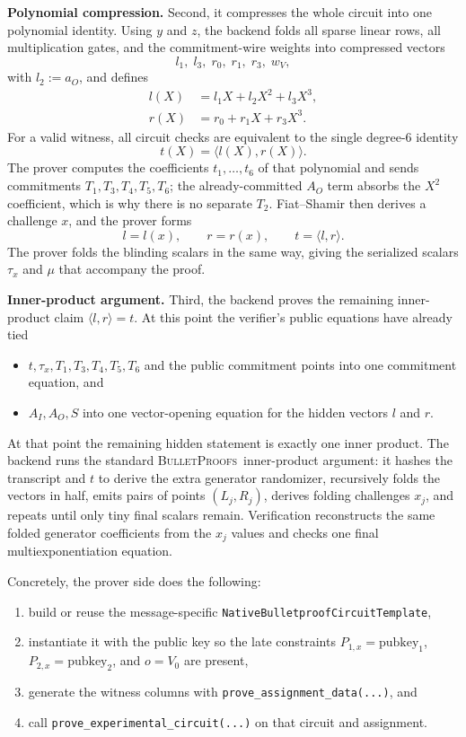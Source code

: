 \documentclass[11pt]{article}
\DeclareRobustCommand{\bp}{{\normalfont\scshape BulletProofs}}
\begin{document}
\medskip\noindent\textbf{Polynomial compression.}
Second, it compresses the whole circuit into one polynomial identity. Using $y$ and $z$, the
backend folds all sparse linear rows, all multiplication gates, and the commitment-wire weights
into compressed vectors
\[
l_1,\; l_3,\; r_0,\; r_1,\; r_3,\; w_V,
\]
with $l_2 := a_O$, and defines
\[
\begin{aligned}
l(X) &= l_1 X + l_2 X^2 + l_3 X^3, \\
r(X) &= r_0 + r_1 X + r_3 X^3.
\end{aligned}
\]
For a valid witness, all circuit checks are equivalent to the single degree-6 identity
\[
t(X) = \langle l(X), r(X) \rangle.
\]
The prover computes the coefficients $t_1,\dots,t_6$ of that polynomial and sends commitments
$T_1,T_3,T_4,T_5,T_6$; the already-committed $A_O$ term absorbs the $X^2$ coefficient,
which is why there is no separate $T_2$. Fiat--Shamir then derives a challenge $x$, and the prover
forms
\[
l = l(x),\qquad r = r(x),\qquad t = \langle l, r \rangle.
\]
The prover folds the blinding scalars in the same way, giving the serialized scalars $\tau_x$ and $\mu$
that accompany the proof.

\medskip\noindent\textbf{Inner-product argument.}
Third, the backend proves the remaining inner-product claim $\langle l,r \rangle = t$. At this
point the verifier's public equations have already tied
\begin{itemize}[nosep]
  \item $t,\tau_x,T_1,T_3,T_4,T_5,T_6$ and the public commitment points into one commitment equation,
  and
  \item $A_I,A_O,S$ into one vector-opening equation for the hidden vectors $l$ and $r$.
\end{itemize}
At that point the remaining hidden statement is exactly one inner product. The backend runs the standard
\bp\ inner-product argument: it hashes the transcript and $t$ to derive the extra generator
randomizer, recursively folds the vectors in half, emits pairs of points $(L_j,R_j)$, derives
folding challenges $x_j$, and repeats until only tiny final scalars remain. Verification
reconstructs the same folded generator coefficients from the $x_j$ values and checks one final
multiexponentiation equation.

Concretely, the prover side does the following:
\begin{enumerate}
  \item build or reuse the message-specific \texttt{NativeBulletproofCircuitTemplate},
  \item instantiate it with the public key so the late constraints
  $P_{1,x}=\text{pubkey}_1$, $P_{2,x}=\text{pubkey}_2$, and $o=V_0$ are present,
  \item generate the witness columns with \texttt{prove\_assignment\_data(...)}, and
  \item call \texttt{prove\_experimental\_circuit(...)} on that circuit and assignment.
\end{enumerate}
\end{document}
